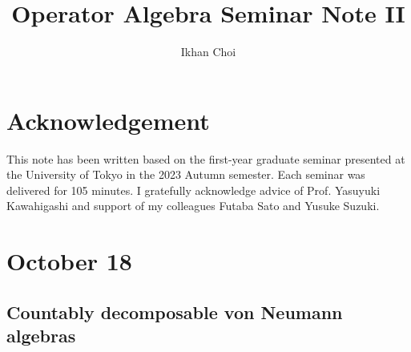 \documentclass{../../../small}
\begin{document}
\title{Operator Algebra Seminar Note II}
\author{Ikhan Choi}
\maketitle
\tableofcontents


\section*{Acknowledgement}
This note has been written based on the first-year graduate seminar presented at the University of Tokyo in the 2023 Autumn semester.
Each seminar was delivered for 105 minutes.
I gratefully acknowledge advice of Prof. Yasuyuki Kawahigashi and support of my colleagues Futaba Sato and Yusuke Suzuki.



\newpage
\section{October 18}

\subsection{Countably decomposable von Neumann algebras}
\end{document}
